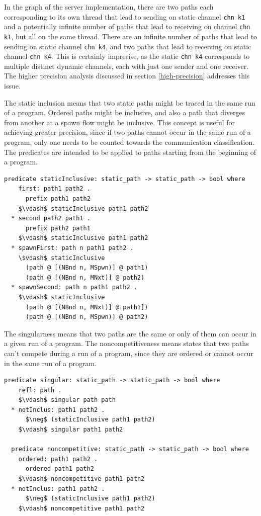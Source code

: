 \documentclass[letterpaper, 11pt]{extarticle}
\begin{document}
In the graph of the server implementation, there are two paths each corresponding to its
own thread that lead
to sending on
static channel \lstinline[language=sugar_lang]{chn k1} and a potentially infinite number of
paths that lead to receiving on
channel \lstinline[language=sugar_lang]{chn k1}, but all on the same thread.
There are an infinite number of paths that lead
to sending on static channel \lstinline[language=sugar_lang]{chn k4}, and two paths
that lead to receiving on static channel
\lstinline[language=sugar_lang]{chn k4}. This is certainly imprecise,
as the static \lstinline[language=sugar_lang]{chn k4} corresponds to
multiple distinct dynamic channels, each with just one sender and one receiver.  The higher
precision analysis discussed in section \ref{high-precision} addresses this issue.

The static inclusion means that two static paths might be traced in
the same run of a program. Ordered paths might be inclusive, and also a path that diverges
from another at a spawn flow might be inclusive. This concept is useful for achieving
greater precision, since if two paths cannot occur in the same run of a program, only one needs
to be counted towards the communication classification. The predicates are intended to be applied
to paths starting from the beginning of a program.

\begin{lstlisting}[language=logic, mathescape]
  predicate staticInclusive: static_path -> static_path -> bool where
    first: path1 path2 .
      prefix path1 path2
    $\vdash$ staticInclusive path1 path2
  * second path2 path1 .
      prefix path2 path1
    $\vdash$ staticInclusive path1 path2
  * spawnFirst: path n path1 path2 .
    \$vdash$ staticInclusive
      (path @ [(NBnd n, MSpwn)] @ path1)
      (path @ [(NBnd n, MNxt)] @ path2)
  * spawnSecond: path n path1 path2 .
    $\vdash$ staticInclusive
      (path @ [(NBnd n, MNxt)] @ path1])
      (path @ [(NBnd n, MSpwn)] @ path2)
\end{lstlisting}

The singularness means that two paths are the same or only of them can occur in a given run of
a program. The noncompetitiveness means states that two paths can't compete during a run of a
program, since they are ordered or cannot occur in the same run of a program.

\begin{lstlisting}[language=logic, mathescape]
  predicate singular: static_path -> static_path -> bool where
    refl: path .
    $\vdash$ singular path path
  * notInclus: path1 path2 .
      $\neg$ (staticInclusive path1 path2)
    $\vdash$ singular path1 path2

  predicate noncompetitive: static_path -> static_path -> bool where
    ordered: path1 path2 .
      ordered path1 path2
    $\vdash$ noncompetitive path1 path2
  * notInclus: path1 path2 .
      $\neg$ (staticInclusive path1 path2)
    $\vdash$ noncompetitive path1 path2
\end{lstlisting}
\end{document}
